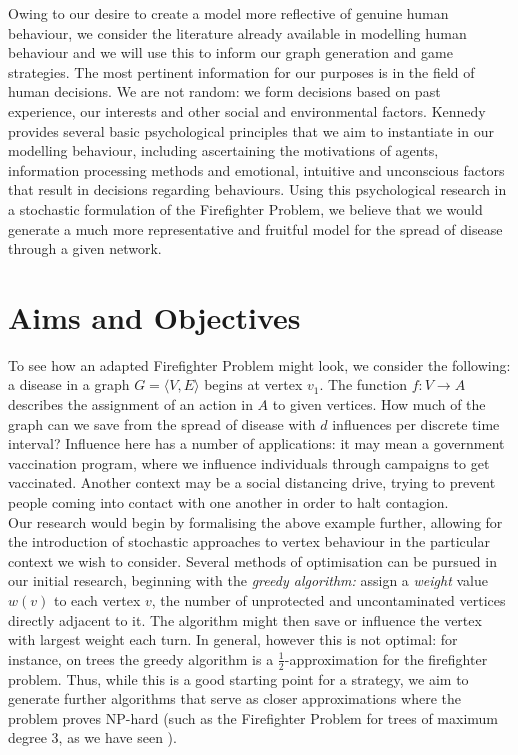 \documentclass[hidelinks,a4paper,11pt]{article}
\numberwithin{equation}{section}
\begin{document}
Owing to our desire to create a model more reflective of genuine human behaviour, we consider the literature already available in modelling human behaviour and we will use this to inform our graph generation and game strategies. The most pertinent information for our purposes is in the field of human decisions. We are not random: we form decisions based on past experience, our interests and other social and environmental factors. Kennedy provides several basic psychological principles that we aim to instantiate in our modelling behaviour, including ascertaining the motivations of agents, information processing methods and emotional, intuitive and unconscious factors that result in decisions regarding behaviours. \cite{kennedy12} Using this psychological research in a stochastic formulation of the Firefighter Problem, we believe that we would generate a much more representative and fruitful model for the spread of disease through a given network.\\


\section{Aims and Objectives}
\label{sec:aims}

To see how an adapted Firefighter Problem might look, we consider the following: a disease in a graph $G=\langle V,E\rangle$ begins at vertex $v_1$. The function $f:V\rightarrow A$ describes the assignment of an action in $A$ to given vertices. How much of the graph can we save from the spread of disease with $d$ influences per discrete time interval? Influence here has a number of applications: it may mean a government vaccination program, where we influence individuals through campaigns to get vaccinated. Another context may be a social distancing drive, trying to prevent people coming into contact with one another in order to halt contagion. \\

Our research would begin by formalising the above example further, allowing for the introduction of stochastic approaches to vertex behaviour in the particular context we wish to consider. Several methods of optimisation can be pursued in our initial research, beginning with the {\it greedy algorithm:} assign a {\it weight} value $w(v)$ to each vertex $v$, the number of unprotected and uncontaminated vertices directly adjacent to it. The algorithm might then save or influence the vertex with largest weight each turn. In general, however this is not optimal: for instance, on trees the greedy algorithm is a $\frac{1}{2}$-approximation for the firefighter problem. \cite{finbow09} Thus, while this is a good starting point for a strategy, we aim to generate further algorithms that serve as closer approximations where the problem proves NP-hard (such as the Firefighter Problem for trees of maximum degree 3, as we have seen \cite{finbow07}).\\
\end{document}
